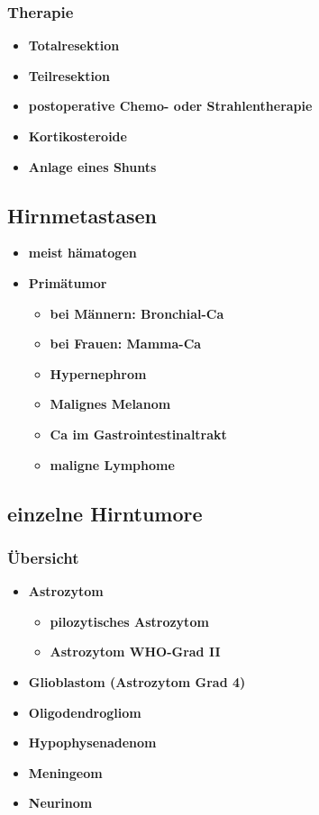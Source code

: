 	\subsubsection{Therapie}
		\begin{itemize}
			\item \textbf{Totalresektion}
			\item \textbf{Teilresektion}
			\item \textbf{postoperative Chemo- oder Strahlentherapie}
			\item \textbf{Kortikosteroide}
			\item \textbf{Anlage eines Shunts}
		\end{itemize}
		
\subsection{Hirnmetastasen}
	\begin{itemize}
		\item \textbf{meist hämatogen}
		\item \textbf{Primätumor}
			\begin{itemize}
				\item \textbf{bei Männern: Bronchial-Ca}
				\item \textbf{bei Frauen: Mamma-Ca}
				\item \textbf{Hypernephrom}
				\item \textbf{Malignes Melanom}
				\item \textbf{Ca im Gastrointestinaltrakt}
				\item \textbf{maligne Lymphome}
			\end{itemize}
	\end{itemize}
	
\subsection{einzelne Hirntumore}
	\subsubsection{Übersicht}
		\begin{itemize}
			\item \textbf{Astrozytom}
				\begin{itemize}
					\item \textbf{pilozytisches Astrozytom}
					\item \textbf{Astrozytom WHO-Grad II}
				\end{itemize}					
			\item \textbf{Glioblastom (Astrozytom Grad 4)}
			\item \textbf{Oligodendrogliom}
			\item \textbf{Hypophysenadenom}
			\item \textbf{Meningeom}
			\item \textbf{Neurinom}
		\end{itemize}
		
